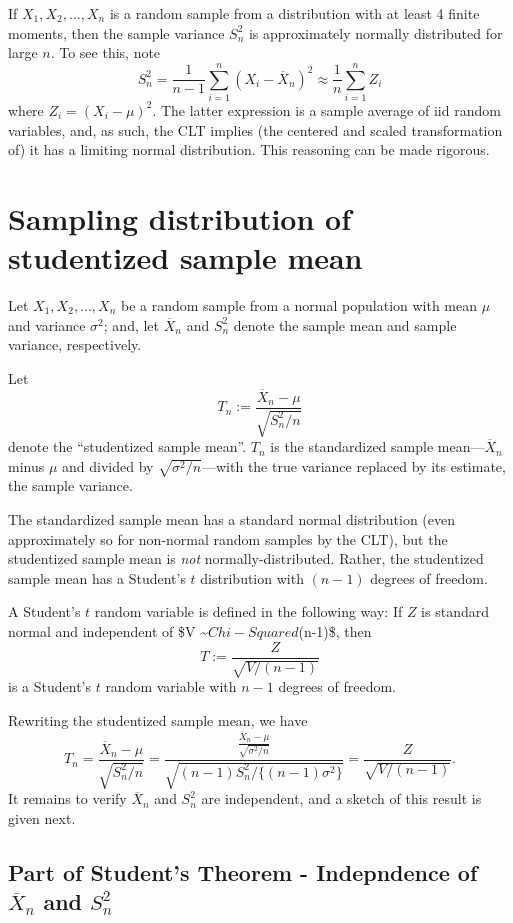 \documentclass[
]{book}
\begin{document}
If \(X_1, X_2, \ldots, X_n\) is a random sample from a distribution with at least 4 finite moments, then the sample variance \(S_n^2\) is approximately normally distributed for large \(n\). To see this, note
\[S_n^2 = \frac{1}{n-1}\sum_{i=1}^n (X_i - \overline X_n)^2 \approx \frac{1}{n}\sum_{i=1}^n Z_i\]
where \(Z_i = (X_i - \mu)^2\). The latter expression is a sample average of iid random variables, and, as such, the CLT implies (the centered and scaled transformation of) it has a limiting normal distribution. This reasoning can be made rigorous.

\hypertarget{sampling-distribution-of-studentized-sample-mean}{%
\section{Sampling distribution of studentized sample mean}\label{sampling-distribution-of-studentized-sample-mean}}

Let \(X_1, X_2, \ldots, X_n\) be a random sample from a normal population with mean \(\mu\) and variance \(\sigma^2\); and, let \(\overline X_n\) and \(S_n^2\) denote the sample mean and sample variance, respectively.

Let
\[T_n:=\frac{\overline X_n - \mu}{\sqrt{S_n^2 / n}}\]
denote the ``studentized sample mean''. \(T_n\) is the standardized sample mean---\(\overline X_n\) minus \(\mu\) and divided by \(\sqrt{\sigma^2/n}\)---with the true variance replaced by its estimate, the sample variance.

The standardized sample mean has a standard normal distribution (even approximately so for non-normal random samples by the CLT), but the studentized sample mean is \emph{not} normally-distributed. Rather, the studentized sample mean has a Student's \(t\) distribution with \((n-1)\) degrees of freedom.

A Student's \(t\) random variable is defined in the following way: If \(Z\) is standard normal and independent of \$V \sim \(Chi-Squared\)(n-1)\$, then
\[T:=\frac{Z}{\sqrt{V/(n-1)}}\]
is a Student's \(t\) random variable with \(n-1\) degrees of freedom.

Rewriting the studentized sample mean, we have
\[T_n = \frac{\overline X_n - \mu}{\sqrt{S_n^2 / n}} = \frac{\frac{\overline X_n - \mu}{\sqrt{\sigma^2 / n}}}{\sqrt{(n-1)S_n^2/\{(n-1)\sigma^2\}}} = \frac{Z}{\sqrt{V/(n-1)}}.\]
It remains to verify \(\overline X_n\) and \(S_n^2\) are independent, and a sketch of this result is given next.

\hypertarget{part-of-students-theorem---indepndence-of-overline-x_n-and-s_n2}{%
\subsection{\texorpdfstring{Part of Student's Theorem - Indepndence of \(\overline X_n\) and \(S_n^2\)}{Part of Student's Theorem - Indepndence of \textbackslash overline X\_n and S\_n\^{}2}}\label{part-of-students-theorem---indepndence-of-overline-x_n-and-s_n2}}
\end{document}
